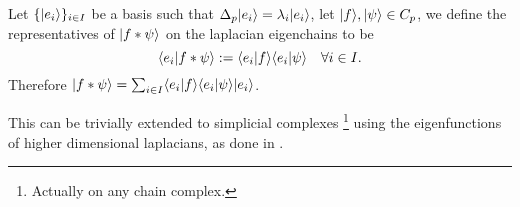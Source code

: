 \documentclass[../3.tex]{subfiles}
\begin{document}
    \begin{defn}
        Let $\{| e_i \rangle\}_{i \in I}$ be a basis such that $\Delta_p| e_i \rangle = \lambda_i| e_i \rangle$, let $| f \rangle,| \psi \rangle \in C_p$, we define the representatives of $| f * \psi \rangle$ on
        the laplacian eigenchains to be 
        \[ \langle e_i | f * \psi \rangle := \langle e_i | f \rangle\langle e_i | \psi \rangle \quad \forall i \in I.\]
        Therefore $| f * \psi \rangle = \sum_{i \in I}\langle e_i | f \rangle\langle e_i | \psi \rangle| e_i \rangle$.
    \end{defn}

    This can be trivially extended to simplicial complexes \footnote{Actually on any chain complex.} using the eigenfunctions of higher dimensional laplacians, as done in \cite{simplicialNN}.
\end{document}
